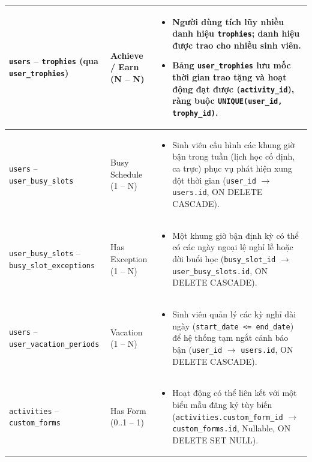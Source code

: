 \begin{longtable}{|p{}|p{}|p{}|}
    \texttt{users} -- \texttt{trophies} \newline (qua \texttt{user\_trophies}) & Achieve / Earn \newline (N -- N) & 
    \begin{itemize}
        \item Người dùng tích lũy nhiều danh hiệu \texttt{trophies}; danh hiệu được trao cho nhiều sinh viên.
        \item Bảng \texttt{user\_trophies} lưu mốc thời gian trao tặng và hoạt động đạt được (\texttt{activity\_id}), ràng buộc \texttt{UNIQUE(user\_id, trophy\_id)}.
    \end{itemize} \\ \hline

    \texttt{users} -- \texttt{user\_busy\_slots} & Busy Schedule \newline (1 -- N) & 
    \begin{itemize}
        \item Sinh viên cấu hình các khung giờ bận trong tuần (lịch học cố định, ca trực) phục vụ phát hiện xung đột thời gian (\texttt{user\_id} $\rightarrow$ \texttt{users.id}, ON DELETE CASCADE).
    \end{itemize} \\ \hline

    \texttt{user\_busy\_slots} -- \texttt{busy\_slot\_exceptions} & Has Exception \newline (1 -- N) & 
    \begin{itemize}
        \item Một khung giờ bận định kỳ có thể có các ngày ngoại lệ nghỉ lễ hoặc dời buổi học (\texttt{busy\_slot\_id} $\rightarrow$ \texttt{user\_busy\_slots.id}, ON DELETE CASCADE).
    \end{itemize} \\ \hline

    \texttt{users} -- \texttt{user\_vacation\_periods} & Vacation \newline (1 -- N) & 
    \begin{itemize}
        \item Sinh viên quản lý các kỳ nghỉ dài ngày (\texttt{start\_date <= end\_date}) để hệ thống tạm ngắt cảnh báo bận (\texttt{user\_id} $\rightarrow$ \texttt{users.id}, ON DELETE CASCADE).
    \end{itemize} \\ \hline

    \texttt{activities} -- \texttt{custom\_forms} & Has Form \newline (0..1 -- 1) & 
    \begin{itemize}
        \item Hoạt động có thể liên kết với một biểu mẫu đăng ký tùy biến (\texttt{activities.custom\_form\_id} $\rightarrow$ \texttt{custom\_forms.id}, Nullable, ON DELETE SET NULL).
    \end{itemize} \\ \hline


\end{longtable}
